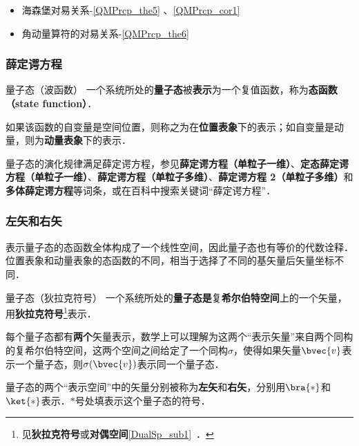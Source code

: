\begin{itemize}
\item 海森堡对易关系-\autoref{QMPrcp_the5} 、\autoref{QMPrcp_cor1} 
\item 角动量算符的对易关系-\autoref{QMPrcp_the6} 
\end{itemize}



\subsubsection{薛定谔方程}

\begin{definition}{量子态（波函数）}\label{QMPrcp_def6}
一个系统所处的\textbf{量子态}被\textbf{表示}为一个复值函数，称为\textbf{态函数（state function）}．

如果该函数的自变量是空间位置，则称之为在\textbf{位置表象}下的表示；如自变量是动量，则为\textbf{动量表象}下的表示．
\end{definition}

量子态的演化规律满足薛定谔方程，参见\textbf{薛定谔方程（单粒子一维）}、\textbf{定态薛定谔方程（单粒子一维）}、\textbf{薛定谔方程（单粒子多维）}、\textbf{薛定谔方程 2（单粒子多维）}和\textbf{多体薛定谔方程}等词条，或在百科中搜索关键词“薛定谔方程”．

\subsubsection{左矢和右矢}

表示量子态的态函数全体构成了一个线性空间，因此量子态也有等价的代数诠释．位置表象和动量表象的态函数的不同，相当于选择了不同的基矢量后矢量坐标不同．

\begin{definition}{量子态（狄拉克符号）}\label{QMPrcp_def4}
一个系统所处的\textbf{量子态}\textbf{是}复\textbf{希尔伯特空间}上的一个矢量，用\textbf{狄拉克符号}\footnote{见\textbf{狄拉克符号}或\textbf{对偶空间}\autoref{DualSp_sub1}~．}表示．

每个量子态都有\textbf{两个}矢量表示，数学上可以理解为这两个“表示矢量”来自两个同构的复希尔伯特空间，这两个空间之间给定了一个同构$\sigma$，使得如果矢量$\bvec{v}$表示一个量子态，则$\sigma(\bvec{v})$表示同一个量子态．

量子态的两个“表示空间”中的矢量分别被称为\textbf{左矢}和\textbf{右矢}，分别用$\bra{*}$和$\ket{*}$表示．$*$号处填表示这个量子态的符号．

\end{definition}

